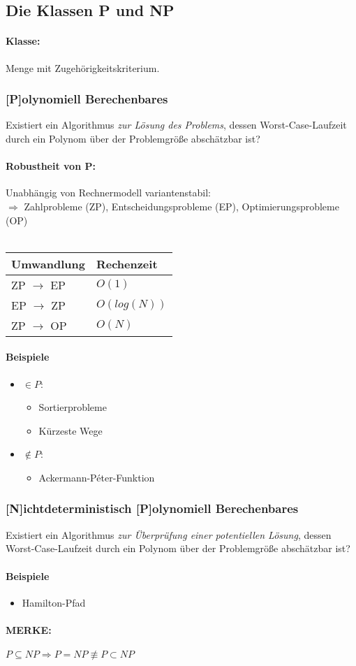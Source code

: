 \documentclass{article}
\begin{document}
\subsection{Die Klassen P und NP}
\paragraph*{Klasse:}
Menge mit Zugehörigkeitskriterium.
\subsubsection{[P]olynomiell Berechenbares}
Existiert ein Algorithmus \emph{zur Lösung des Problems}, dessen Worst-Case-Laufzeit durch ein Polynom über der Problemgröße abschätzbar ist?
\paragraph*{Robustheit von P:}
Unabhängig von Rechnermodell variantenstabil:\\
$\Rightarrow$ Zahlprobleme (ZP), Entscheidungsprobleme (EP), Optimierungsprobleme (OP)\\\\
\begin{tabular}{l | l}
    Umwandlung          & Rechenzeit  \\ \hline
    ZP $\rightarrow$ EP & $O(1)$      \\
    EP $\rightarrow$ ZP & $O(log(N))$ \\
    ZP $\rightarrow$ OP & $O(N)$
\end{tabular}
\paragraph*{Beispiele}
\begin{itemize}
    \item $\in P$:
          \begin{itemize}
              \item Sortierprobleme
              \item Kürzeste Wege
          \end{itemize}
    \item $\notin P$:
          \begin{itemize}
              \item Ackermann-P\'eter-Funktion
          \end{itemize}
\end{itemize}
\subsubsection{[N]ichtdeterministisch [P]olynomiell Berechenbares}
Existiert ein Algorithmus \emph{zur Überprüfung einer potentiellen Lösung}, dessen Worst-Case-Laufzeit durch ein Polynom über der Problemgröße abschätzbar ist?
\paragraph*{Beispiele}
\begin{itemize}
    \item Hamilton-Pfad
\end{itemize}
\paragraph*{MERKE:}
$P \subseteq NP \Rightarrow P = NP\not\equiv P \subset NP$
\end{document}
